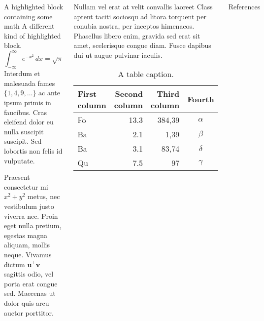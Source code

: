 \documentclass{beamer}
\begin{document}
\begin{frame}[t]
\begin{columns}[t]
    \column{0.3\paperwidth}
    \begin{exampleblock}{A highlighted block containing some math}
      A different kind of highlighted block.
      $$\int_{-\infty}^{\infty} e^{-x^2}\,dx = \sqrt{\pi}$$
      Interdum et malesuada fames $\{1, 4, 9, \ldots\}$ ac ante ipsum primis in
      faucibus. Cras eleifend dolor eu nulla suscipit suscipit. Sed lobortis non
      felis id vulputate.

      Praesent consectetur mi $x^2 + y^2$ metus, nec vestibulum justo viverra
      nec. Proin eget nulla pretium, egestas magna aliquam, mollis neque. Vivamus
      dictum $\mathbf{u}^\intercal\mathbf{v}$ sagittis odio, vel porta erat
      congue sed. Maecenas ut dolor quis arcu auctor porttitor.
    \end{exampleblock}

    \begin{block}{Nullam vel erat at velit convallis laoreet}
      Class aptent taciti sociosqu ad litora torquent per conubia nostra, per
      inceptos himenaeos. Phasellus libero enim, gravida sed erat sit amet,
      scelerisque congue diam. Fusce dapibus dui ut augue pulvinar iaculis.
      \begin{table}
        \centering
        \begin{tabular}{l r r c}
          \toprule
          \textbf{First column} & \textbf{Second column} & \textbf{Third column} & \textbf{Fourth} \\
          \midrule
          Fo                    & 13.3                   & 384,39                & $\alpha$        \\
          Ba                    & 2.1                    & 1,39                  & $\beta$         \\
          Ba                    & 3.1                    & 83,74                 & $\delta$        \\
          Qu                    & 7.5                    & 97                    & $\gamma$        \\
          \bottomrule
        \end{tabular}
        \caption{A table caption.}
      \end{table}
    \end{block}

    \begin{block}{References}
      \nocite{*}
      \footnotesize{}
    \end{block}
  \end{columns}
\end{frame}
\end{document}
